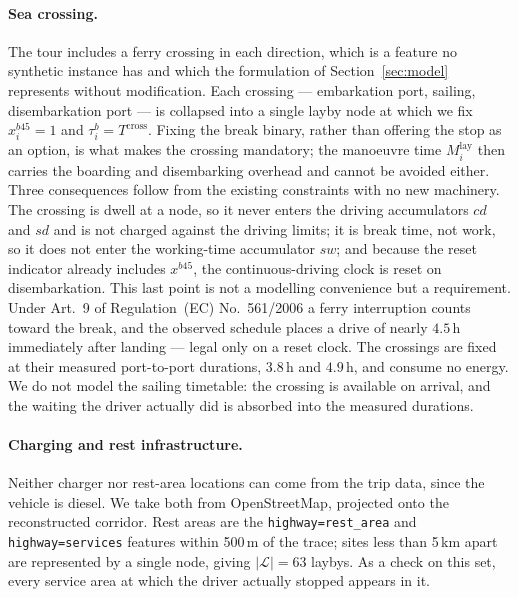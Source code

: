 \paragraph{Sea crossing.}
The tour includes a ferry crossing in each direction, which is a feature no
synthetic instance has and which the formulation of Section~\ref{sec:model}
represents without modification.  Each crossing --- embarkation port, sailing,
disembarkation port --- is collapsed into a single layby node at which we fix
$x^{b45}_i = 1$ and $\tau^b_i = T^{\text{cross}}$.  Fixing the break binary,
rather than offering the stop as an option, is what makes the crossing
mandatory; the manoeuvre time $M^{\text{lay}}_i$ then carries the boarding and
disembarking overhead and cannot be avoided either.  Three consequences follow
from the existing constraints with no new machinery.  The crossing is dwell at
a node, so it never enters the driving accumulators $cd$ and $sd$ and is not
charged against the driving limits; it is break time, not work, so it does not
enter the working-time accumulator $sw$; and because the reset indicator
already includes $x^{b45}$, the continuous-driving clock is reset on
disembarkation.  This last point is not a modelling convenience but a
requirement.  Under Art.~9 of Regulation~(EC) No.~561/2006 a ferry
interruption counts toward the break, and the observed schedule places a drive
of nearly $4.5$\,h immediately after landing --- legal only on a reset clock.  The
crossings are fixed at their measured port-to-port durations, $3.8$\,h and
$4.9$\,h, and consume no energy.  We do not model the sailing timetable: the
crossing is available on arrival, and the waiting the driver actually did is
absorbed into the measured durations.

\paragraph{Charging and rest infrastructure.}
Neither charger nor rest-area locations can come from the trip data, since the
vehicle is diesel.  We take both from OpenStreetMap, projected onto the
reconstructed corridor.  Rest areas are the \texttt{highway=rest\_area} and
\texttt{highway=services} features within 500\,m of the trace; sites less than
5\,km apart are represented by a single node, giving $|\mathcal L| = 63$
laybys.  As a check on this set, every service area at which the driver
actually stopped appears in it.

